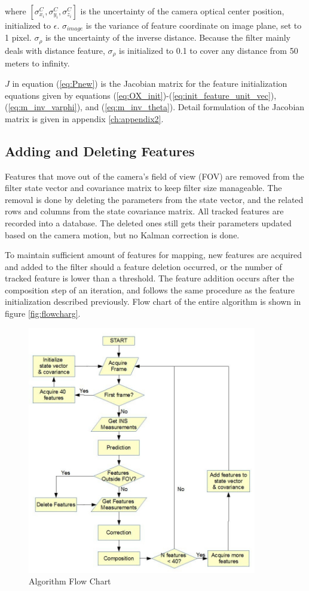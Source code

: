 \noindent where $[\sigma_{x_{i}}^{C}, \sigma_{y_{i}}^{C}, \sigma
_{z_{i}}^{C}]$ is the uncertainty of the camera optical center
position, initialized to $\epsilon$. $\sigma_{image}$ is the
variance of feature coordinate on image plane, set to 1 pixel. $\sigma
_{\rho }$ is the uncertainty of the inverse distance. Because the
filter mainly deals with distance feature, $ \sigma _{\rho }$ is
initialized to 0.1 to cover any distance from 50 meters to infinity.

$J$ in equation (\ref{eq:Pnew}) is the Jacobian matrix for the feature
initialization equations given by equations
(\ref{eq:OX_init})-(\ref{eq:init_feature_unit_vec}),
(\ref{eq:m_inv_varphi}), and (\ref{eq:m_inv_theta}). Detail
formulation of the Jacobian matrix is given in appendix
\ref{ch:appendix2}.



\subsection{Adding and Deleting Features}
Features that move out of the camera's field of view (FOV) are removed
from the filter state vector and covariance matrix to keep filter size
manageable. The removal is done by deleting the parameters from the
state vector, and the related rows and columns from the state
covariance matrix. All tracked features are recorded into a database.
The deleted ones still gets their parameters updated based on the
camera motion, but no Kalman correction is done.

To maintain sufficient amount of features for mapping, new features 
are acquired and added to the filter should a feature deletion 
occurred, or the number of tracked feature is lower than a threshold. The 
feature addition occurs after the composition step of an 
iteration, and follows the same procedure as the feature
initialization described previously. Flow chart of the entire
algorithm is shown in figure \ref{fig:flowcharg}. 

\begin{figure}[h]
\centering
\includegraphics[width=10cm, keepaspectratio=true]{./Figures/flow_chart.jpg}
\caption{Algorithm Flow Chart}
\label{fig:flowchart}
\end{figure}

